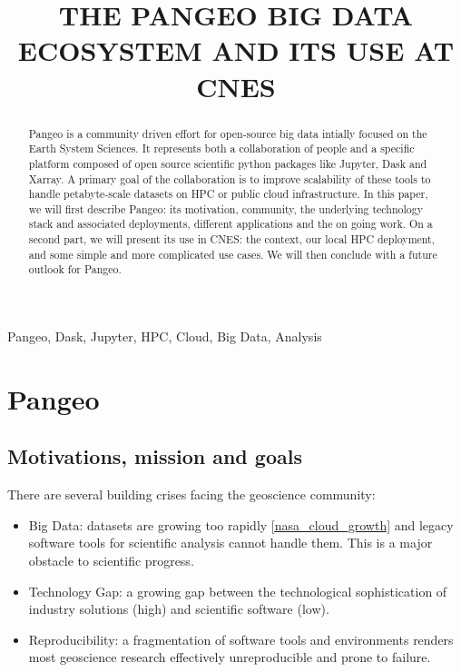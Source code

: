 \documentclass{article}
\title{THE PANGEO BIG DATA ECOSYSTEM AND ITS USE AT CNES}
\begin{document}
%
\maketitle
%
\begin{abstract}
Pangeo\cite{b1} is a community driven effort for open-source big data intially focused on the Earth System Sciences. It represents both a collaboration of people and a specific platform composed of open source scientific python packages like Jupyter, Dask and Xarray. A primary goal of the collaboration is to improve scalability of these tools to handle petabyte-scale datasets on HPC or public cloud infrastructure.
In this paper, we will first describe Pangeo: its motivation, community, the underlying technology stack and associated deployments, different applications and the on going work. On a second part, we will present its use in CNES: the context, our local HPC deployment, and some simple and more complicated use cases. We will then conclude with a future outlook for Pangeo.
\end{abstract}
%
\begin{keywords}
Pangeo, Dask, Jupyter, HPC, Cloud, Big Data, Analysis
\end{keywords}
%
\section{Pangeo}
\label{sec:pangeo}

\subsection{Motivations, mission and goals}
\label{ssec:motivations}

There are several building crises facing the geoscience community:

\begin{itemize}
\item Big Data: datasets are growing too rapidly \ref{nasa_cloud_growth} and legacy software tools for scientific analysis cannot handle them. This is a major obstacle to scientific progress.
\item Technology Gap: a growing gap between the technological sophistication of industry solutions (high) and scientific software (low).
\item Reproducibility: a fragmentation of software tools and environments renders most geoscience research effectively unreproducible and prone to failure.
\end{itemize}
\end{document}
